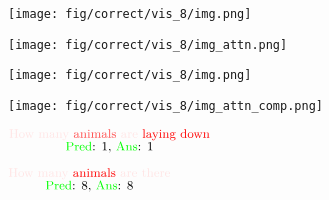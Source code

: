 \documentclass{article} \usepackage[dvipsnames,table]{xcolor}
\begin{document}
\begin{figure}[t]
\centering
    \begin{minipage}[t]{0.47\linewidth}
        \begin{minipage}{0.47\linewidth}
            \centering
            \texttt{[image: fig/correct/vis\_8/img.png]}
        \end{minipage}
        \begin{minipage}{0.47\linewidth}
            \centering
            \texttt{[image: fig/correct/vis\_8/img\_attn.png]}
        \end{minipage}
    \end{minipage}
    \begin{minipage}[t]{0.47\linewidth}
        \begin{minipage}{0.47\linewidth}
            \centering
            \texttt{[image: fig/correct/vis\_8/img.png]}
        \end{minipage}
        \begin{minipage}{0.47\linewidth}
            \centering
            \texttt{[image: fig/correct/vis\_8/img\_attn\_comp.png]}
        \end{minipage}
    \end{minipage}
    
    \centering
    \begin{minipage}[t]{0.47\linewidth}
        \centering
        $\substack{
            \text{\small {\color[rgb]{1,0.9,0.9}How many} {\color[rgb]{1,0.3,0.3}animals} {\color[rgb]{1,0.9,0.9}are} {\color[rgb]{1,0,0}laying down}} \\
            \text{\small {{\color[rgb]{0,1,0}Pred}: 1, {\color[rgb]{0,1,0}Ans}: 1}}
            }$
    \end{minipage}
    \begin{minipage}[t]{0.47\linewidth}
        \centering
        $\substack{
            \text{\small {\color[rgb]{1,0.9,0.9}How many} {\color[rgb]{1,0,0}animals} {\color[rgb]{1,0.9,0.9}are there}} \\
            \text{\small {{\color[rgb]{0,1,0}Pred}: 8, {\color[rgb]{0,1,0}Ans}: 8}}
            }$
    \end{minipage}
    

\end{figure}
\end{document}
